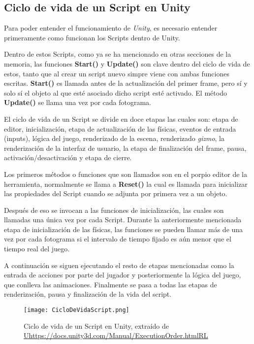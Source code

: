 \subsection{Ciclo de vida de un Script en Unity}

Para poder entender el funcionamiento de \textit{Unity}, es necesario entender primeramente como funcionan los Scripts dentro de Unity.

Dentro de estos Scripts, como ya se ha mencionado en otras secciones de la memoria, las funciones \textbf{Start()} y \textbf{Update()} son clave dentro del ciclo de vida de estos, tanto que al crear un script nuevo simpre viene con ambas funciones escritas. \textbf{Start()} es llamada antes de la actualización del primer frame, pero sí y solo sí el objeto al que esté asociado dicho script esté activado. El método \textbf{Update()} se llama una vez por cada fotograma.

El ciclo de vida de un Script se divide en doce etapas las cuales son: etapa de editor, inicialización, etapa de actualización de las físicas, eventos de entrada (inputs), lógica del juego, renderizado de la escena, renderizado \textit{gizmo}, la renderización de la interfaz de usuario, la etapa de finalización del frame, pausa, activación/desactivación y etapa de cierre. 

Los primeros métodos o funciones que son llamados son en el porpio editor de la herramienta, normalmente se llama a \textbf{Reset()} la cual es llamada para inicializar las propiedades del Script cuando se adjunta por primera vez a un objeto.

Después de eso se invocan a las funciones de inicialización, las cuales son llamadas una única vez por cada Script. Durante la anteriormente mencionada etapa de inicialización de las físicas, las funciones se pueden llamar más de una vez por cada fotograma si el intervalo de tiempo fijado es aún menor que el tiempo real del juego. 

A continuación se siguen ejecutando el resto de etapas mencionadas como la entrada de acciones por parte del jugador y posteriormente la lógica del juego, que conlleva las animaciones. Finalmente se pasa a todas las etapas de renderización, pausa y finalización de la vida del script.

\begin{figure}[H]
    \centering
    \texttt{[image: CicloDeVidaScript.png]}
    \caption{Ciclo de vida de un Script en Unity, extraído de \url{Uhttps://docs.unity3d.com/Manual/ExecutionOrder.htmlRL}}
\end{figure}

